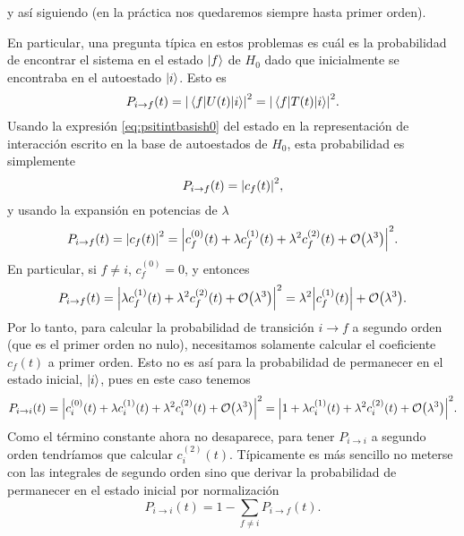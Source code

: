 \documentclass[10pt, a4paper]{article}
\numberwithin{equation}{subsection}
\begin{document}
y así siguiendo (en la práctica nos quedaremos siempre hasta primer orden).

\bigbreak

En particular, una pregunta típica en estos problemas es cuál es la
probabilidad de encontrar el sistema en el estado $\ket{f}$ de $H_0$ dado que
inicialmente se encontraba en el autoestado $\ket{i}$. Esto es
\begin{equation}
  P_{i \to f}(t) = \abs{\matrixel{f}{U(t)}{i}}^2 =
    \abs{\matrixel{f}{T(t)}{i}}^2.
\end{equation}
Usando la expresión \eqref{eq:psitintbasish0} del estado en la representación
de interacción escrito en la base de autoestados de $H_0$, esta probabilidad es
simplemente
\begin{equation}
  P_{i \to f}(t) = \abs{c_f(t)}^2,
\end{equation}
y usando la expansión en potencias de $\lambda$
\begin{equation} \label{eq:probtrans}
  P_{i \to f}(t)
  = \abs{c_f(t)}^2
  = \abs{c^{(0)}_f(t) + \lambda c^{(1)}_f(t) + \lambda^2 c^{(2)}_f(t) +
    \order{\lambda^3}}^2.
\end{equation}
En particular, si $f \neq i$, $c^{(0)}_f = 0$, y entonces
\begin{equation} \label{eq:probtrans1stord}
  P_{i \to f}(t)
  = \abs{\lambda c^{(1)}_f(t) + \lambda^2 c^{(2)}_f(t) +
    \order{\lambda^3}}^2
  = \lambda^2 \abs{c^{(1)}_f(t)} + \order{\lambda^3}.
\end{equation}
Por lo tanto, para calcular la probabilidad de transición $i \to f$ a segundo
orden (que es el primer orden no nulo), necesitamos solamente calcular el
coeficiente $c_f(t)$ a primer orden. Esto no es así para la probabilidad de
permanecer en el estado inicial, $\ket{i}$, pues en este caso tenemos
\begin{equation} \label{eq:probrem1stord}
  P_{i \to i}(t)
  = \abs{c^{(0)}_i(t) + \lambda c^{(1)}_i(t) + \lambda^2 c^{(2)}_i(t) +
    \order{\lambda^3}}^2
  = \abs{1 + \lambda c^{(1)}_i(t) + \lambda^2 c^{(2)}_i(t) +
    \order{\lambda^3}}^2.
\end{equation}
Como el término constante ahora no desaparece, para tener $P_{i \to i}$ a
segundo orden tendríamos que calcular $c^{(2)}_i(t)$. Típicamente es más
sencillo no meterse con las integrales de segundo orden sino que derivar la
probabilidad de permanecer en el estado inicial por normalización
\begin{equation}
  P_{i \to i}(t) = 1 - \sum_{f \neq i}P_{i \to f}(t).
\end{equation}
\end{document}
